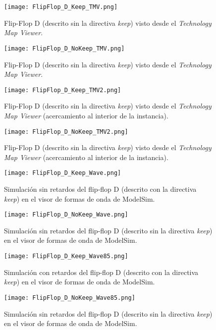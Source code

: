 \begin{figure}[ht]
	\centering
	\texttt{[image: FlipFlop\_D\_Keep\_TMV.png]}
	\caption{Flip-Flop D (descrito sin la directiva \textit{keep}) visto desde el \textit{Technology Map Viewer}. \label{fig:FlipFlop_D_Keep_TMV}}
\end{figure}

\begin{figure}[ht]
	\centering
	\texttt{[image: FlipFlop\_D\_NoKeep\_TMV.png]}
	\caption{Flip-Flop D (descrito sin la directiva \textit{keep}) visto desde el \textit{Technology Map Viewer}. \label{fig:FlipFlop_D_NoKeep_TMV}}
\end{figure}

\begin{figure}[ht]
	\centering
	\texttt{[image: FlipFlop\_D\_Keep\_TMV2.png]}
	\caption{Flip-Flop D (descrito sin la directiva \textit{keep}) visto desde el \textit{Technology Map Viewer} (acercamiento al interior de la instancia). \label{fig:FlipFlop_D_Keep_TMV2}}
\end{figure}

\begin{figure}[ht]
	\centering
	\texttt{[image: FlipFlop\_D\_NoKeep\_TMV2.png]}
	\caption{Flip-Flop D (descrito sin la directiva \textit{keep}) visto desde el \textit{Technology Map Viewer} (acercamiento al interior de la instancia). \label{fig:FlipFlop_D_NoKeep_TMV2}}
\end{figure}

\begin{figure}[ht]
	\centering
	\texttt{[image: FlipFlop\_D\_Keep\_Wave.png]}
	\caption{Simulación sin retardos del flip-flop D (descrito con la directiva \textit{keep}) en el visor de formas de onda de ModelSim. \label{fig:FlipFlop_D_Keep_Wave}}
\end{figure}

\begin{figure}[ht]
	\centering
	\texttt{[image: FlipFlop\_D\_NoKeep\_Wave.png]}
	\caption{Simulación sin retardos del flip-flop D (descrito sin la directiva \textit{keep}) en el visor de formas de onda de ModelSim. \label{fig:FlipFlop_D_NoKeep_Wave}}
\end{figure}

\begin{figure}[ht]
	\centering
	\texttt{[image: FlipFlop\_D\_Keep\_Wave85.png]}
	\caption{Simulación con retardos del flip-flop D (descrito con la directiva \textit{keep}) en el visor de formas de onda de ModelSim. \label{fig:FlipFlop_D_Keep_Wave85}}
\end{figure}

\begin{figure}[ht]
	\centering
	\texttt{[image: FlipFlop\_D\_NoKeep\_Wave85.png]}
	\caption{Simulación sin retardos del flip-flop D (descrito sin la directiva \textit{keep}) en el visor de formas de onda de ModelSim. \label{fig:FlipFlop_D_NoKeep_Wave85}}
\end{figure}